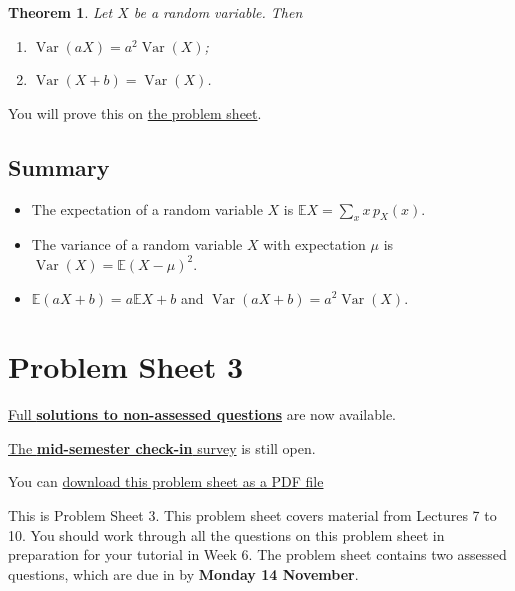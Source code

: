\documentclass[
  a4paper,
]{book}
\providecommand{\tightlist}{%
  \setlength{\itemsep}{0pt}\setlength{\parskip}{0pt}}
\newif\ifcomm\commtrue
\newtheorem{theorem}{Theorem}[chapter]
\theoremstyle{definition}
\theoremstyle{definition}
\theoremstyle{definition}
\theoremstyle{definition}
\theoremstyle{remark}
\begin{document}
\begin{theorem}

Let \(X\) be a random variable. Then

\begin{enumerate}
\def\labelenumi{\arabic{enumi}.}
\tightlist
\item
  \(\operatorname{Var}(aX) = a^2\operatorname{Var}(X)\);
\item
  \(\operatorname{Var}(X + b) = \operatorname{Var}(X)\).
\end{enumerate}

\end{theorem}

You will prove this on \protect\hyperlink{P3}{the problem sheet}.

\hypertarget{summary-L10}{%
\section*{Summary}\label{summary-L10}}

\begin{itemize}
\tightlist
\item
  The expectation of a random variable \(X\) is \(\mathbb EX = \sum_x x\, p_X(x)\).
\item
  The variance of a random variable \(X\) with expectation \(\mu\) is \(\operatorname{Var}(X) = \mathbb E(X - \mu)^2\).
\item
  \(\mathbb E(aX+b) = a\mathbb EX + b\) and \(\operatorname{Var}(aX+b) = a^2\operatorname{Var}(X)\).
\end{itemize}

\hypertarget{P3}{%
\chapter*{Problem Sheet 3}\label{P3}}

\commfalse

\protect\hyperlink{P3-solutions}{Full \textbf{solutions to non-assessed questions}} are now available.

\href{https://forms.office.com/Pages/ResponsePage.aspx?id=qO3qvR3IzkWGPlIypTW3ywARQdZlKXRHsLcXi_ngX8NUNkoxWUlTSTBXQUVSUThGU0pXOTMwTjA0UC4u}{The \textbf{mid-semester check-in} survey} is still open.

You can \href{P3-sheet.pdf}{download this problem sheet as a PDF file}

This is Problem Sheet 3. This problem sheet covers material from Lectures 7 to 10. You should work through all the questions on this problem sheet in preparation for your tutorial in Week 6. The problem sheet contains two assessed questions, which are due in by \textbf{Monday 14 November}.
\end{document}
